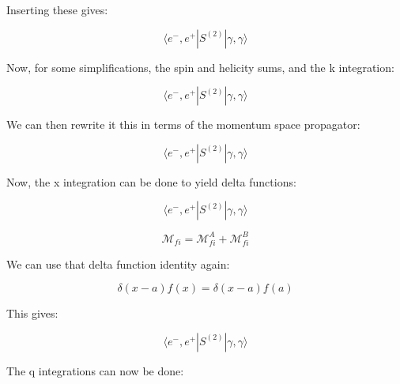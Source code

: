 \documentclass[a4]{article}
\begin{document}
\begin{framed}
            Inserting these gives:

            \begin{equation}
                \langle e^{-}, e^{+} | S^{(2)} | \gamma, \gamma \rangle
            \end{equation}

            Now, for some simplifications, the spin and helicity sums, and the k integration:

            \begin{equation}
                \langle e^{-}, e^{+} | S^{(2)} | \gamma, \gamma \rangle
            \end{equation}

            We can then rewrite it this in terms of the momentum space propagator:

            \begin{equation}
                \langle e^{-}, e^{+} | S^{(2)} | \gamma, \gamma \rangle
            \end{equation}

            Now, the x integration can be done to yield delta functions:

            \begin{equation}
                \langle e^{-}, e^{+} | S^{(2)} | \gamma, \gamma \rangle
            \end{equation}

            \begin{equation}
                \mathcal{M}_{fi} = \mathcal{M}_{fi}^{A} + \mathcal{M}_{fi}^{B}
            \end{equation}

            We can use that delta function identity again:

            \begin{equation}
                \delta (x - a) f (x) = \delta (x - a) f(a)
            \end{equation}

            This gives:

            \begin{equation}
                \langle e^{-}, e^{+} | S^{(2)} | \gamma, \gamma \rangle
            \end{equation}

            The q integrations can now be done:

        \end{framed}
\end{document}

